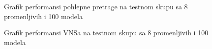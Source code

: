 \documentclass[12pt,oneside]{memoir}
\begin{document}
\begin{figure}[H]
    \centering
    \hfill
    \caption{Grafik performansi pohlepne pretrage na testnom skupu sa 8 promenljivih i 100 modela}
    \label{fig:test1_greedy_performance}
\end{figure}


\begin{figure}[H]
    \centering
    \hfill
    \caption{Grafik performansi VNSa na testnom skupu sa 8 promenljivih i 100 modela}
    \label{fig:test1_vns_performance}
\end{figure}
\end{document}
